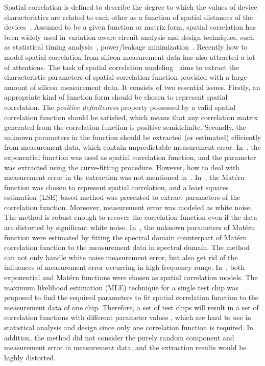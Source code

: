 \documentclass[referee]{ieice}
\begin{document}
Spatial correlation is defined to describe the degree to which the
values of device characteristics are related to each other as a
function of spatial distances of the devices~\cite{Friedberg05}.
Assumed to be a given function or matrix form, spatial correlation
has been widely used in variation aware circuit analysis and design
techniques, such as statistical timing
analysis~\cite{Chang05,Zhang06}, power/leakage
minimization~\cite{Bhardwaj06,Heloue07}.
Recently how to model spatial correlation from silicon measurement
data  has also attracted a lot of attentions. The task of spatial
correlation
modeling~\cite{Friedberg05,Doh05,Xiong07,Liu07,Hargreaves08,Fu08}
aims to extract the characteristic parameters of spatial correlation
function provided with a large amount of silicon measurement data.
It consists of two essential issues. Firstly, an appropriate kind of
function form should be chosen to represent spatial correlation. The
{\it positive definiteness} property possessed by a valid spatial
correlation function should be satisfied, which means that any
correlation matrix generated from the correlation function is
positive semidefinite. Secondly, the unknown parameters in the
function should be extracted (or estimated) efficiently from
measurement data, which contain unpredictable measurement error.
In~\cite{Liu07}, the exponential function was used as spatial
correlation function, and the parameter was extracted using the
curve-fitting procedure. However, how to deal with measurement error
in the extraction was not mentioned in~\cite{Liu07}.
In~\cite{Xiong07}, the Mat\'{e}rn function was chosen to represent
spatial correlation, and a least squares estimation (LSE) based
method was presented to extract parameters of the correlation
function. Moreover, measurement error was modeled as white noise.
The method is robust enough to recover the correlation function even
if the data are distorted by significant white noise.
In~\cite{Fu08}, the unknown parameters of Mat\'{e}rn function were
estimated by fitting the spectral domain counterpart of Mat\'{e}rn
correlation function to the measurement data in spectral domain. The
method can not only handle white noise measurement error, but also
get rid of the influences of measurement error occurring in high
frequency range. In~\cite{Hargreaves08}, both exponential and
Mat\'{e}rn functions were chosen as spatial correlation models. The
maximum likelihood estimation (MLE) technique for a single test chip
was proposed to find the required parameters to fit spatial
correlation function to the measurement data of one chip. Therefore,
a set of test chips will result in a set of correlation functions
with different parameter values \cite{Hargreaves08}, which are hard
to use in statistical analysis and design since only one correlation
function is required. In addition, the method did not consider the
purely random component and measurement error in measurement data,
and the extraction results would be highly distorted.
\end{document}
